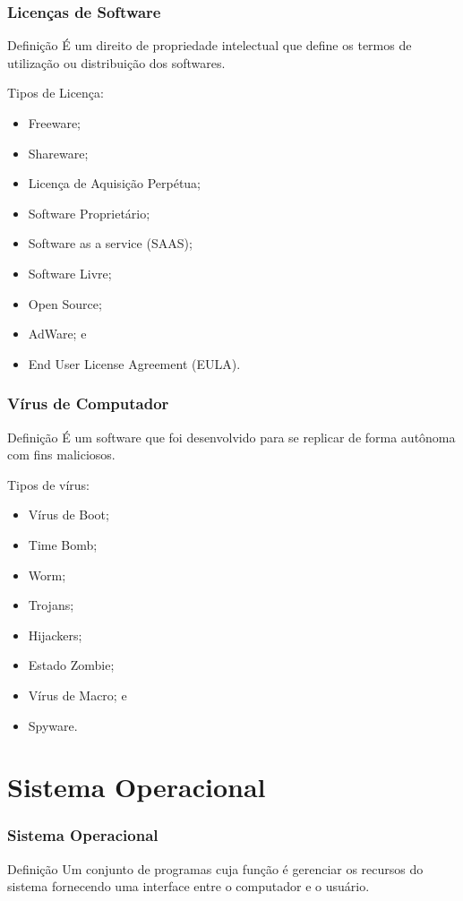 \documentclass[aspectratio=169]{beamer} %
\begin{document}
\begin{frame}
	\frametitle{Licen\c cas de Software}

	\begin{block}{Defini\c cão}
		É um direito de propriedade intelectual que define os termos de utiliza\c cão ou distribui\c cão dos softwares.
	\end{block}\vfill
		
	Tipos de Licen\c ca:
	\begin{itemize}
		\item Freeware;
		\item Shareware;
		\item Licen\c ca de Aquisi\c cão Perpétua;
		\item Software Proprietário;
		\item Software as a service (SAAS);
		\item Software Livre;
		\item Open Source;
		\item AdWare; e
		\item End User License Agreement (EULA).
	\end{itemize}
\end{frame}

\begin{frame}
	\frametitle{Vírus de Computador}

	\begin{block}{Defini\c cão}
		É um software que foi desenvolvido para se replicar de forma autônoma com fins maliciosos.
	\end{block}\vfill
		
	Tipos de vírus:
	\begin{itemize}
		\item Vírus de Boot;
		\item Time Bomb;
		\item Worm;
		\item Trojans;
		\item Hijackers;
		\item Estado Zombie;
		\item Vírus de Macro; e
		\item Spyware.
	\end{itemize}
\end{frame}

\section{Sistema Operacional}

\begin{frame}
	\frametitle{Sistema Operacional}
	
	\begin{block}{Defini\c cão}
		Um conjunto de programas cuja função é gerenciar os recursos do sistema fornecendo uma interface entre o computador e o usuário.
	\end{block}
\end{frame}
\end{document}
